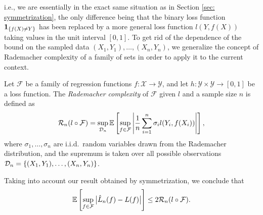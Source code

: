 i.e., we are essentially in the exact same situation as in Section \ref{sec: symmetrization}, the only difference being that the binary loss function $\mathbf{1}_{\left\{f(X) \neq Y\right\}}$ has been replaced by a more general loss function $l(Y, f(X))$ taking values in the unit interval $[0, 1]$. To get rid of the dependence of the bound on the sampled data $(X_1, Y_1), \dots, (X_n, Y_n)$, we generalize the concept of Rademacher complexity of a family of sets in order to apply it to the current context.

\begin{definition}
Let $\mathcal{F}$ be a family of regression functions $f \colon \mathcal{X} \to \mathcal{Y}$, and let $h \colon \mathcal{Y} \times \mathcal{Y} \to [0, 1]$ be a loss function. The \emph{Rademacher complexity} of $\mathcal{F}$ given $l$ and a sample size $n$ is defined as
\[
    \mathcal{R}_n(l \circ \mathcal{F}) = \sup_{\mathcal{D}_n} \mathbb{E}\left[ \sup_{f \in \mathcal{F}} \abs{\frac{1}{n} \sum_{i=1}^n \sigma_i l(Y_i, f(X_i))}\right],
\]
where $\sigma_1, \dots, \sigma_n$ are i.i.d.\ random variables drawn from the Rademacher distribution, and the supremum is taken over all possible observations $\mathcal{D}_n = \left\{(X_1, Y_1), \dots, (X_n, Y_n)\right\}$.
\end{definition}
Taking into account our result obtained by symmetrization, we conclude that
\[
    \mathbb{E}\left[ \sup_{f \in \mathcal{F}} \big\lvert\hat L_n(f) - L(f)\big\rvert \right] \leq 2 \mathcal{R}_n(l \circ \mathcal{F}).
\]

